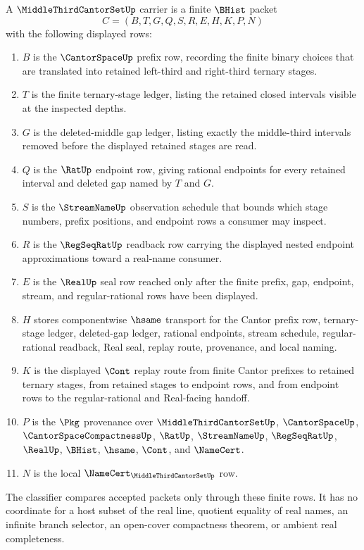 \begin{definition}
\label{def:middle-third-cantor-set-carrier}
A $\MiddleThirdCantorSetUp$ carrier is a finite $\BHist$ packet
$$
C=(B,T,G,Q,S,R,E,H,K,P,N)
$$
with the following displayed rows:
\begin{enumerate}
\item $B$ is the $\CantorSpaceUp$ prefix row, recording the finite binary choices that are translated into retained left-third and right-third ternary stages.
\item $T$ is the finite ternary-stage ledger, listing the retained closed intervals visible at the inspected depths.
\item $G$ is the deleted-middle gap ledger, listing exactly the middle-third intervals removed before the displayed retained stages are read.
\item $Q$ is the $\RatUp$ endpoint row, giving rational endpoints for every retained interval and deleted gap named by $T$ and $G$.
\item $S$ is the $\StreamNameUp$ observation schedule that bounds which stage numbers, prefix positions, and endpoint rows a consumer may inspect.
\item $R$ is the $\RegSeqRatUp$ readback row carrying the displayed nested endpoint approximations toward a real-name consumer.
\item $E$ is the $\RealUp$ seal row reached only after the finite prefix, gap, endpoint, stream, and regular-rational rows have been displayed.
\item $H$ stores componentwise $\hsame$ transport for the Cantor prefix row, ternary-stage ledger, deleted-gap ledger, rational endpoints, stream schedule, regular-rational readback, Real seal, replay route, provenance, and local naming.
\item $K$ is the displayed $\Cont$ replay route from finite Cantor prefixes to retained ternary stages, from retained stages to endpoint rows, and from endpoint rows to the regular-rational and Real-facing handoff.
\item $P$ is the $\Pkg$ provenance over $\MiddleThirdCantorSetUp$, $\CantorSpaceUp$, $\CantorSpaceCompactnessUp$, $\RatUp$, $\StreamNameUp$, $\RegSeqRatUp$, $\RealUp$, $\BHist$, $\hsame$, $\Cont$, and $\NameCert$.
\item $N$ is the local $\NameCert_{\MiddleThirdCantorSetUp}$ row.
\end{enumerate}
The classifier compares accepted packets only through these finite rows. It has no coordinate for a host subset of the real line, quotient equality of real names, an infinite branch selector, an open-cover compactness theorem, or ambient real completeness.
\end{definition}

